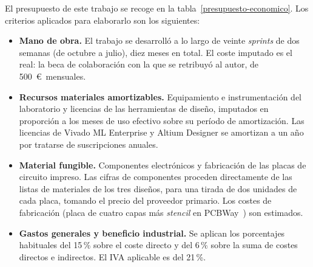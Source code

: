 El presupuesto de este trabajo se recoge en la tabla~\ref{presupuesto-economico}. Los criterios
aplicados para elaborarlo son los siguientes:

\begin{itemize}
    \item \textbf{Mano de obra.} El trabajo se desarrolló a lo largo de veinte \textit{sprints} de
    dos semanas (de octubre a julio), diez meses en total. El coste imputado es el real: la beca de
    colaboración con la que se retribuyó al autor, de 500~\euro\ mensuales.

    \item \textbf{Recursos materiales amortizables.} Equipamiento e instrumentación del laboratorio
    y licencias de las herramientas de diseño, imputados en proporción a los meses de uso efectivo
    sobre su período de amortización. Las licencias de Vivado ML Enterprise y Altium Designer se
    amortizan a un año por tratarse de suscripciones anuales.

    \item \textbf{Material fungible.} Componentes electrónicos y fabricación de las placas de
    circuito impreso. Las cifras de componentes proceden directamente de las listas de materiales
    de los tres diseños, para una tirada de dos unidades de cada placa, tomando el precio del
    proveedor primario. Los costes de fabricación (placa de cuatro capas más \textit{stencil} en
    PCBWay~\cite{pcbway_caps}) son estimados.

    \item \textbf{Gastos generales y beneficio industrial.} Se aplican los porcentajes habituales
    del 15\,\% sobre el coste directo y del 6\,\% sobre la suma de costes directos e indirectos.
    El IVA aplicable es del 21\,\%.
\end{itemize}

